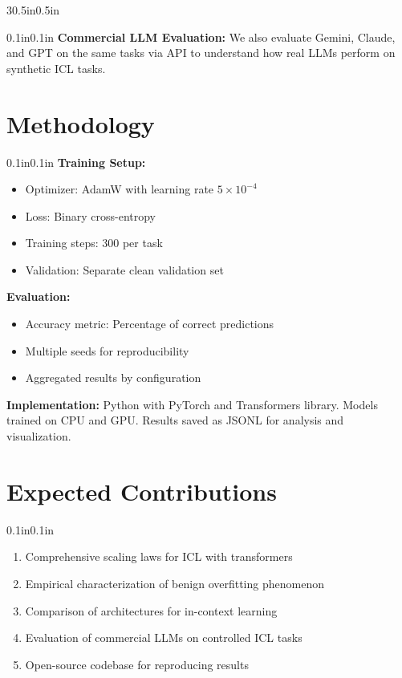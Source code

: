 \documentclass[article,36pt,extrafontsizes,oneside,openany,oldfontcommands]{memoir}
\begin{document}
\begin{adjmulticols*}{3}{0.5in}{0.5in}
\begin{adjustwidth}{0.1in}{0.1in}
\textbf{Commercial LLM Evaluation:} We also evaluate Gemini, Claude, and GPT on the same tasks via API to understand how real LLMs perform on synthetic ICL tasks.

\end{adjustwidth}

\section{Methodology}

\begin{adjustwidth}{0.1in}{0.1in}
\textbf{Training Setup:}
\begin{itemize}[topsep=0pt,itemsep=0ex,partopsep=1ex,parsep=1ex]
\item Optimizer: AdamW with learning rate $5 \times 10^{-4}$
\item Loss: Binary cross-entropy
\item Training steps: 300 per task
\item Validation: Separate clean validation set
\end{itemize}

\vspace{0.15in}
\textbf{Evaluation:}
\begin{itemize}[topsep=0pt,itemsep=0ex,partopsep=1ex,parsep=1ex]
\item Accuracy metric: Percentage of correct predictions
\item Multiple seeds for reproducibility
\item Aggregated results by configuration
\end{itemize}

\textbf{Implementation:} Python with PyTorch and Transformers library. Models trained on CPU and GPU. Results saved as JSONL for analysis and visualization.

\end{adjustwidth}

\vspace{1.5in}

\section{Expected Contributions}

\begin{adjustwidth}{0.1in}{0.1in}
\begin{enumerate}[topsep=0pt,itemsep=0ex,partopsep=1ex,parsep=1ex]
\item Comprehensive scaling laws for ICL with transformers
\item Empirical characterization of benign overfitting phenomenon
\item Comparison of architectures for in-context learning
\item Evaluation of commercial LLMs on controlled ICL tasks
\item Open-source codebase for reproducing results
\end{enumerate}
\end{adjustwidth}

% 
% 

\end{adjmulticols*}
\end{document}

